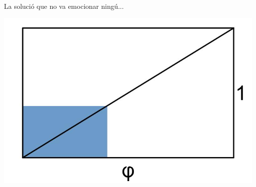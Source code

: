 \documentclass[14pt]{beamer}
\begin{document}

    {
    \begin{frame}[plain]
    \end{frame}
    }


    \begin{frame}{La solució que no va emocionar ningú...}
        \begin{center}
            \includegraphics[height=30ex]{pictures/Rectangle.jpg}
        \end{center}
    \end{frame}

\end{document}
